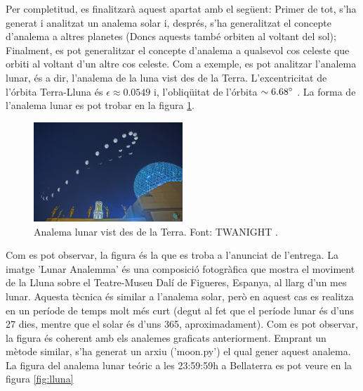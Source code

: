 \documentclass[a4paper, 11pt]{article}
\begin{document}
\vspace{2mm}

\noindent Per completitud, es finalitzarà aquest apartat amb el següent: Primer de tot, s'ha generat i analitzat un analema solar i, després, s'ha generalitzat el concepte d'analema a altres planetes (Doncs aquests també orbiten al voltant del sol); Finalment, es pot generalitzar el concepte d'analema a qualsevol cos celeste que orbiti al voltant d'un altre cos celeste. Com a exemple, es pot analitzar l'analema lunar, és a dir, l'analema de la luna vist des de la Terra. L'excentricitat de l'órbita Terra-Lluna és $\epsilon \approx 0.0549$ i, l'obliqüitat de l'órbita $\sim 6.68 \degree$ \cite{LLUNA}. La forma de l'analema lunar es pot trobar en la figura \ref{fig:analema_luna}.

\begin{figure}[h!]
    \centering
    \includegraphics[width=0.50\textwidth]{images/analema_luna.jpg}
    \caption{Analema lunar vist des de la Terra. Font: TWANIGHT \cite{ANALEMA_MOON}.}
    \label{fig:analema_luna}
\end{figure}

\vspace{2mm}

\noindent Com es pot observar, la figura és la que es troba a l'anunciat de l'entrega. La imatge 'Lunar Analemma' és una composició fotogràfica que mostra el moviment de la Lluna sobre el Teatre-Museu Dalí de Figueres, Espanya, al llarg d'un mes lunar. Aquesta tècnica és similar a l'analema solar, però en aquest cas es realitza en un període de temps molt més curt (degut al fet que el període lunar és d'uns 27 dies, mentre que el solar és d'uns 365, aproximadament). Com es pot observar, la figura és coherent amb els analemes graficats anteriorment. Emprant un mètode similar, s'ha generat un arxiu ('moon.py') el qual gener aquest analema. La figura del analema lunar teóric a les 23:59:59h a Bellaterra es pot veure en la figura \ref{fig:lluna}
\end{document}

